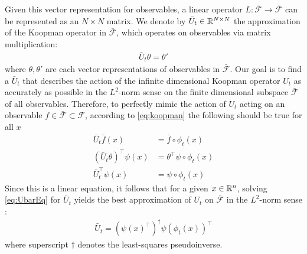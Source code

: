 Given this vector representation for observables, a linear operator $L : \bar{\mathcal{F}} \to \bar{\mathcal{F}}$ can be represented as an ${N \times N}$ matrix. 
We denote by $\bar{U}_t \in \mathbb{R}^{N \times N}$ the approximation of the Koopman operator in $\bar{\mathcal{F}}$, which operates on observables via matrix multiplication:
\begin{align}
    \bar{U}_t \theta = \theta'
\end{align}
where $\theta , \theta'$ are each vector representations of observables in $\bar{\mathcal{F}}$.
Our goal is to find a $\bar{U}_t$ that describes the action of the infinite dimensional Koopman operator $U_t$ as accurately as possible in the $L^2$-norm sense on the finite dimensional subspace $\bar{\mathcal{F}}$  of all observables.
Therefore, to perfectly mimic the action of $U_t$ acting on an observable ${f \in \bar{\mathcal{F}} \subset \mathcal{F}}$, according to \eqref{eq:koopman} the following should be true for all $x$ 
\begin{align}
    \bar{U}_t \bar{f}(x) &= \bar{f} \circ \phi_t (x) \\
    ( \bar{U}_t {\theta} )^\top {\psi}(x) &=
    {\theta}^\top {\psi} \circ \phi_t(x) \\
    \bar{U}_t^\top \psi(x) &= {\psi} \circ \phi_t(x)
    \label{eq:UbarEq}
\end{align}
Since this is a linear equation, it follows that for a given ${x \in \mathbb{R}^n}$, solving \eqref{eq:UbarEq} for $\bar{U}_t$ yields the best approximation of $U_t$ on $\bar{\mathcal{F}}$ in the $L^2$-norm sense :
\begin{align}
    \bar{U}_t = \left( {\psi}(x)^\top \right)^\dagger {\psi}( \phi_t(x) )^\top
    \label{eq:Uapprox}
\end{align}
where superscript $\dagger$ denotes the least-squares pseudoinverse.

